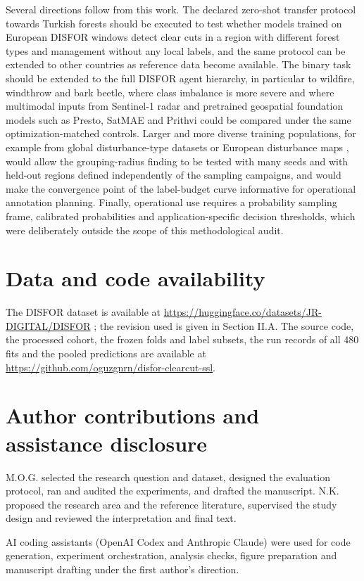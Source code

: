 \documentclass[10pt,a4paper,twocolumn]{article}
\begin{document}
Several directions follow from this work. The declared zero-shot transfer protocol towards Turkish forests should be executed to test whether models trained on European DISFOR windows detect clear cuts in a region with different forest types and management without any local labels, and the same protocol can be extended to other countries as reference data become available. The binary task should be extended to the full DISFOR agent hierarchy, in particular to wildfire, windthrow and bark beetle, where class imbalance is more severe and where multimodal inputs from Sentinel-1 radar \cite{ref2,ref29} and pretrained geospatial foundation models such as Presto, SatMAE and Prithvi \cite{ref7,ref15,ref16} could be compared under the same optimization-matched controls. Larger and more diverse training populations, for example from global disturbance-type datasets \cite{ref24} or European disturbance maps \cite{ref28,ref18}, would allow the grouping-radius finding to be tested with many seeds and with held-out regions defined independently of the sampling campaigns, and would make the convergence point of the label-budget curve informative for operational annotation planning. Finally, operational use requires a probability sampling frame, calibrated probabilities and application-specific decision thresholds, which were deliberately outside the scope of this methodological audit.

\section*{Data and code availability}
The DISFOR dataset is available at \url{https://huggingface.co/datasets/JR-DIGITAL/DISFOR} \cite{ref1}; the revision used is given in Section II.A. The source code, the processed cohort, the frozen folds and label subsets, the run records of all 480 fits and the pooled predictions are available at \url{https://github.com/oguzgnrn/disfor-clearcut-ssl}.

\section*{Author contributions and assistance disclosure}
M.O.G. selected the research question and dataset, designed the evaluation protocol, ran and audited the experiments, and drafted the manuscript. N.K. proposed the research area and the reference literature, supervised the study design and reviewed the interpretation and final text.

AI coding assistants (OpenAI Codex and Anthropic Claude) were used for code generation, experiment orchestration, analysis checks, figure preparation and manuscript drafting under the first author's direction.
\end{document}
